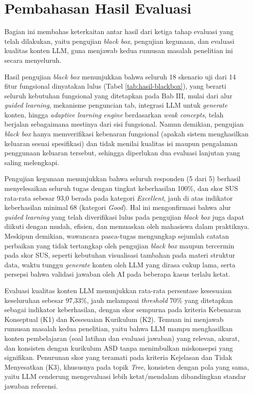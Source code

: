 \section{Pembahasan Hasil Evaluasi}

Bagian ini membahas keterkaitan antar hasil dari ketiga tahap evaluasi yang telah dilakukan, yaitu pengujian \textit{black box}, pengujian kegunaan, dan evaluasi kualitas konten LLM, guna menjawab kedua rumusan masalah penelitian ini secara menyeluruh.

Hasil pengujian \textit{black box} menunjukkan bahwa seluruh 18 skenario uji dari 14 fitur fungsional dinyatakan lulus (Tabel \ref{tab:hasil-blackbox}), yang berarti seluruh kebutuhan fungsional yang ditetapkan pada Bab III, mulai dari alur \textit{guided learning}, mekanisme penguncian tab, integrasi LLM untuk \textit{generate} konten, hingga \textit{adaptive learning engine} berdasarkan \textit{weak concepts}, telah berjalan sebagaimana mestinya dari sisi fungsional. Namun demikian, pengujian \textit{black box} hanya memverifikasi kebenaran fungsional (apakah sistem menghasilkan keluaran sesuai spesifikasi) dan tidak menilai kualitas isi maupun pengalaman penggunaan keluaran tersebut, sehingga diperlukan dua evaluasi lanjutan yang saling melengkapi.

Pengujian kegunaan menunjukkan bahwa seluruh responden (5 dari 5) berhasil menyelesaikan seluruh tugas dengan tingkat keberhasilan 100\%, dan skor SUS rata-rata sebesar 93,0 berada pada kategori \textit{Excellent}, jauh di atas indikator keberhasilan minimal 68 (kategori \textit{Good}). Hal ini mengonfirmasi bahwa alur \textit{guided learning} yang telah diverifikasi lulus pada pengujian \textit{black box} juga dapat diikuti dengan mudah, efisien, dan memuaskan oleh mahasiswa dalam praktiknya. Meskipun demikian, wawancara pasca-tugas mengungkap sejumlah catatan perbaikan yang tidak tertangkap oleh pengujian \textit{black box} maupun tercermin pada skor SUS, seperti kebutuhan visualisasi tambahan pada materi struktur data, waktu tunggu \textit{generate} konten oleh LLM yang dirasa cukup lama, serta persepsi bahwa validasi jawaban oleh AI pada beberapa kasus terlalu ketat.

Evaluasi kualitas konten LLM menunjukkan rata-rata persentase kesesuaian keseluruhan sebesar 97,33\%, jauh melampaui \textit{threshold} 70\% yang ditetapkan sebagai indikator keberhasilan, dengan skor sempurna pada kriteria Kebenaran Konseptual (K1) dan Kesesuaian Kurikulum (K2). Temuan ini menjawab rumusan masalah kedua penelitian, yaitu bahwa LLM mampu menghasilkan konten pembelajaran (soal latihan dan evaluasi jawaban) yang relevan, akurat, dan konsisten dengan kurikulum ASD tanpa menimbulkan miskonsepsi yang signifikan. Penurunan skor yang teramati pada kriteria Kejelasan dan Tidak Menyesatkan (K3), khususnya pada topik \textit{Tree}, konsisten dengan pola yang sama, yaitu LLM cenderung mengevaluasi lebih ketat/mendalam dibandingkan standar jawaban referensi.

